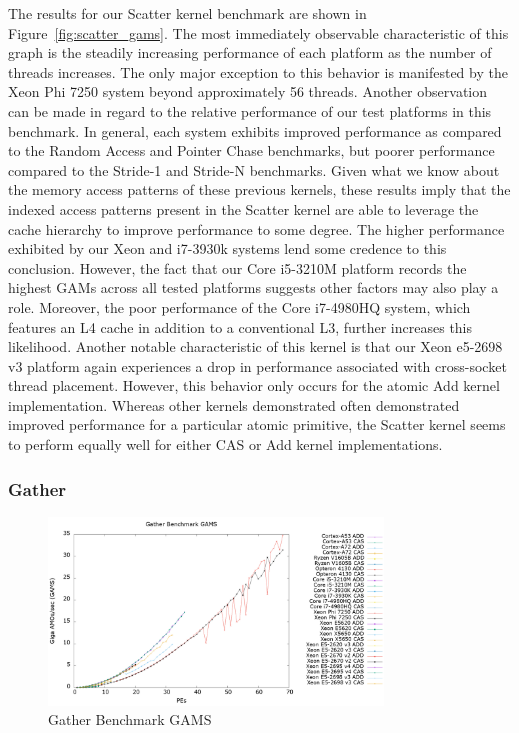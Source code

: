 The results for our Scatter kernel benchmark are shown in Figure~\ref{fig:scatter_gams}.
The most immediately observable characteristic of this graph is the steadily increasing performance of each platform as the number of threads increases.
The only major exception to this behavior is manifested by the Xeon Phi 7250 system beyond approximately 56 threads.
Another observation can be made in regard to the relative performance of our test platforms in this benchmark.
In general, each system exhibits improved performance as compared to the Random Access and Pointer Chase benchmarks, but poorer performance compared to the Stride-1 and Stride-N benchmarks.
Given what we know about the memory access patterns of these previous kernels, these results imply that the indexed access patterns present in the Scatter kernel are able to leverage the cache hierarchy to improve performance to some degree.
The higher performance exhibited by our Xeon and i7-3930k systems lend some credence to this conclusion.
However, the fact that our Core i5-3210M platform records the highest GAMs across all tested platforms suggests other factors may also play a role.
Moreover, the poor performance of the Core i7-4980HQ system, which features an L4 cache in addition to a conventional L3, further increases this likelihood.
Another notable characteristic of this kernel is that our Xeon e5-2698 v3 platform again experiences a drop in performance associated with cross-socket thread placement.
However, this behavior only occurs for the atomic Add kernel implementation.
Whereas other kernels demonstrated often demonstrated improved performance for a particular atomic primitive, the Scatter kernel seems to perform equally well for either CAS or Add kernel implementations.

\subsubsection{Gather}
\label{subsubsec:gather_res}

\begin{figure}[!t]
\centering
\includegraphics[width=3.5in]{figures/GATHER_GAMS.png}
\caption{Gather Benchmark GAMS}
\label{fig:gather_gams}
\end{figure}

